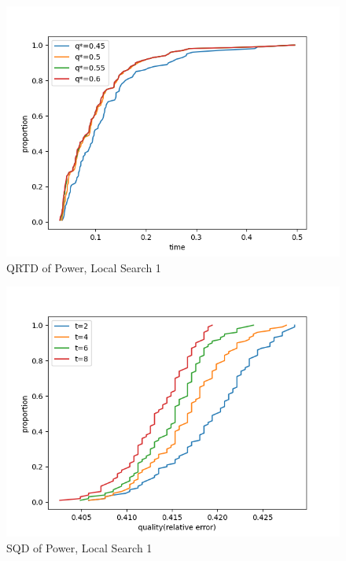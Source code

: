 \documentclass[acmlarge]{acmart}
\begin{document}
\begin{figure}[p]
	\includegraphics[width=\linewidth]{power_QRTD_LS1.png}
	\caption{QRTD of Power, Local Search 1}
\end{figure}


\begin{figure}[p]
	\includegraphics[width=\linewidth]{power_SQD_LS1.png}
	\caption{SQD of Power, Local Search 1}
\end{figure}
\end{document}
